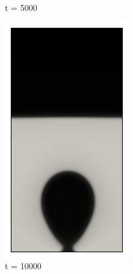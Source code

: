 \begin{figure}[h!]
\begin{subfigure}{0.25\textwidth}
		\caption{t = 5000}
		\label{fig:1}
	\end{subfigure}\hfil 
	\begin{subfigure}{0.25\textwidth}
		\includegraphics[width=\linewidth]{figs/cap4/bubble_10}
		\caption{t = 10000}
		\label{fig:2}
	\end{subfigure}\hfil 
	\begin{subfigure}{0.25\textwidth}

\end{subfigure}
\end{figure}
